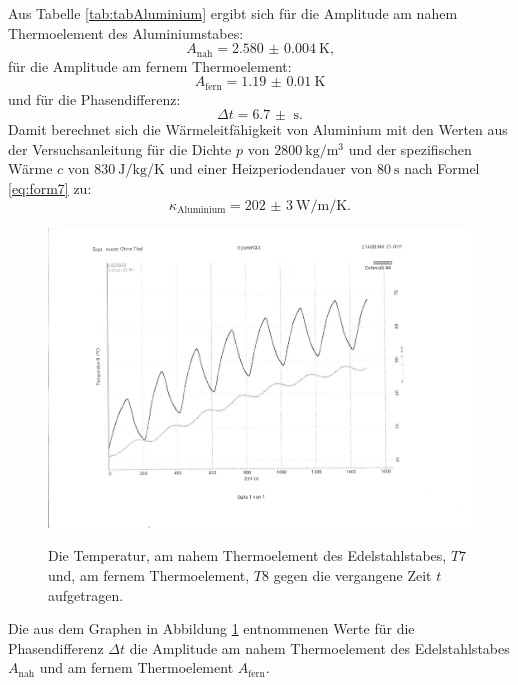 Aus Tabelle \ref{tab:tabAluminium} ergibt sich für die Amplitude am nahem Thermoelement des Aluminiumstabes:
\begin{displaymath}
A_\text{nah} = \SI{2.580(4)}{\kelvin}\text{,}
\end{displaymath}
für die Amplitude am fernem Thermoelement:
\begin{displaymath}
A_\text{fern} = \SI{1.19(1)}{\kelvin}
\end{displaymath}
und für die Phasendifferenz:
\begin{displaymath}
\Delta t = \SI{6.7(0)}{\second}\text{.}
\end{displaymath}
Damit berechnet sich die Wärmeleitfähigkeit von Aluminium mit den Werten aus der Versuchsanleitung \cite{V204} für die Dichte $p$ von $\SI{2800}{\kilo\gram\per\meter\tothe{3}}$ und der spezifischen Wärme $c$ von $\SI{830}{\joule\per\kilo\gram\per\kelvin}$ und einer Heizperiodendauer von $\SI{80}{\second}$ nach Formel \eqref{eq:form7} zu:
\begin{displaymath}
\kappa_\text{Aluminium} = \SI{202(3)}{\watt\per\meter\per\kelvin}\text{.}
\end{displaymath}
\begin{figure}
	\centering
	\caption{Die Temperatur, am nahem Thermoelement des Edelstahlstabes, $T7$ und, am fernem Thermoelement, $T8$ gegen die vergangene Zeit $t$ aufgetragen.}
	\includegraphics[width=\linewidth-70pt,height=\textheight-70pt,keepaspectratio]{content/Bilder/T7T8-rotated.pdf}
	\label{fig:Graph7}
\end{figure}
\begin{table}
	\centering
	\caption{Die aus dem Graphen in Abbildung \ref{fig:Graph7} entnommenen Werte für die Phasendifferenz $\Delta t$ die Amplitude am nahem Thermoelement des Edelstahlstabes $A_\text{nah}$ und am fernem Thermoelement $A_\text{fern}$.}
	
\end{table}

